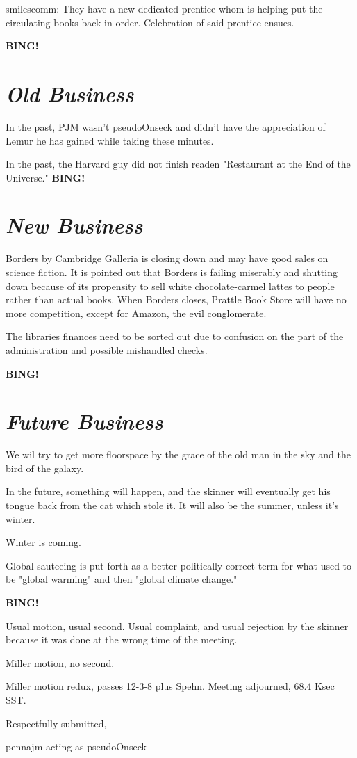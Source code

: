 \documentclass[10pt]{article}
\newcommand{\bing}{{\bf BING!} }
\newcommand{\goto}[1]{\bing \vskip 12pt \section*{{\em{#1}}}}
\newcommand{\onseck}{pennajm acting as pseudoOnseck}
\begin{document}
smilescomm: They have a new dedicated prentice whom is helping put the circulating books back in order. Celebration of said prentice ensues.

\goto{Old Business}

In the past, PJM wasn't pseudoOnseck and didn't have the appreciation of Lemur he has gained while taking these minutes. 

In the past, the Harvard guy did not finish readen "Restaurant at the End of the Universe."
\goto{New Business}

Borders by Cambridge Galleria is closing down and may have good sales on science fiction. It is pointed out that Borders is failing miserably and shutting down because of its propensity to sell white chocolate-carmel lattes to people rather than actual books. When Borders closes, Prattle Book Store will have no more competition, except for Amazon, the evil conglomerate. 

The libraries finances need to be sorted out due to confusion on the part of the administration and possible mishandled checks.  

\goto{Future Business}

We wil try to get more floorspace by the grace of the old man in the sky and the bird of the galaxy. 

In the future, something will happen, and the skinner will eventually get his tongue back from the cat which stole it. It will also be the summer, unless it's winter.

Winter is coming. 

Global sauteeing is put forth as a better politically correct term for what used to be "global warming" and then "global climate change."

\bing

Usual motion, usual second. Usual complaint, and usual rejection by the skinner because it was done at the wrong time of the meeting. 

Miller motion, no second.

Miller motion redux, passes 12-3-8 plus Spehn. 
\noindent
Meeting adjourned, 68.4 Ksec SST.

\vspace{18pt}

\centerline{Respectfully submitted,}
\centerline{\onseck}
\end{document}
